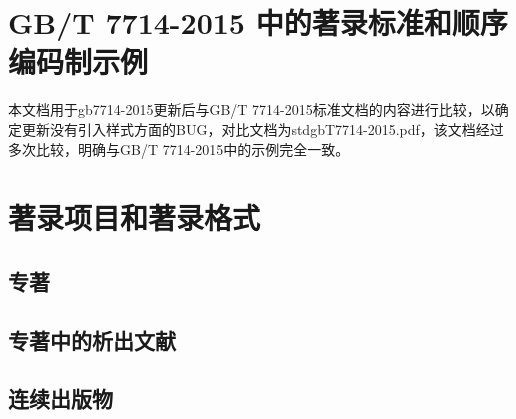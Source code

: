\documentclass{article}
\begin{document}
\section*{GB/T 7714-2015 中的著录标准和顺序编码制示例}

{\heiti\large\noindent 本文档用于gb7714-2015更新后与GB/T 7714-2015标准文档的内容进行比较，以确定更新没有引入样式方面的BUG，对比文档为stdgbT7714-2015.pdf，该文档经过多次比较，明确与GB/T 7714-2015中的示例完全一致。

}

\setcounter{section}{3}

\section{著录项目和著录格式}

\subsection{专著}
\begin{refsection}

\nocite{陈登原2000-29-29,
哈里森沃尔德伦2012-235-236,
北京市政协民族和宗教委员会2012-112-112,
全国信息与文献标准化技术委员会2010-2-3,
徐光宪2010--,
顾炎武1992--,
王夫之1865--,
牛志明2012--,
中国第一历史档案馆2001--,
杨保军2012--,
赵学功2001--,
同济大学土木工程防灾国家重点实验室2011-5-6,
中国造纸学会2003--,
PEEBLES2001--,
Yufin2000--,
Baldock2011-105-105,
Fan2013-25-26
}

\printbibliography[heading=subbibliography,title={示例:}]
\end{refsection}

\subsection{专著中的析出文献}
\begin{refsection}

\nocite{
王夫之2011-1109-1109,
程根伟1999-32-36,
陈晋镳1980-56-114a,
马克思2013-302-302,
贾东琴2011-45-52,
Weinstein1974-745-772,
Roberson2011-1-36
}

\printbibliography[heading=subbibliography,title={示例:}]
\end{refsection}

\subsection{连续出版物}
\begin{refsection}

\nocite{
中华医学会湖北分会1984----,
中国图书馆学会1957--1990--,
AAAS1883----,
}

\printbibliography[heading=subbibliography,title={示例:}]
\end{refsection}
\end{document}
